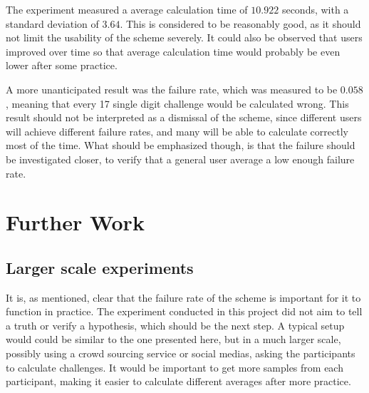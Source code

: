 \par The experiment measured a average calculation time of $10.922$ seconds, with a standard deviation of $3.64$. This is considered to be reasonably good, as it should not limit the usability of the scheme severely. It could also be observed that users improved over time so that average calculation time would probably be even lower after some practice. 
\par A more unanticipated result was the failure rate, which was measured to be $0.058$, meaning that every 17 single digit challenge would be calculated wrong. This result should not be interpreted as a dismissal of the scheme, since different users will achieve different failure rates, and many will be able to calculate correctly most of the time. What should be emphasized though, is that the failure should be investigated closer, to verify that a general user average a low enough failure rate. 


\section{Further Work}


\subsection{Larger scale experiments}
It is, as mentioned, clear that the failure rate of the scheme is important for it to function in practice. The experiment conducted in this project did not aim to tell a truth or verify a hypothesis, which should be the next step. A typical setup would could be similar to the one presented here, but in a much larger scale, possibly using a crowd sourcing service or social medias, asking the participants to calculate challenges. It would be important to get more samples from each participant, making it easier to calculate different averages after more practice.  
